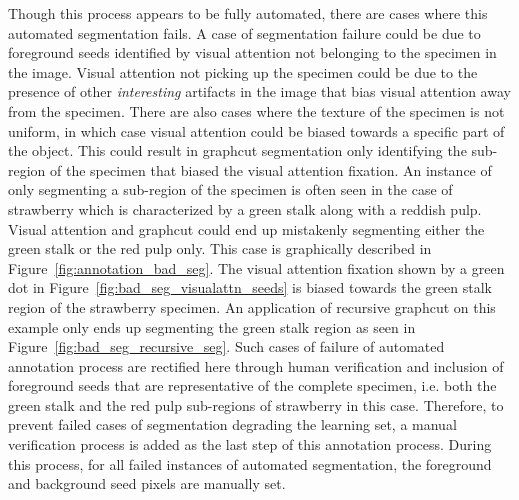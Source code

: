 \documentclass {udthesis}
\begin{document}
Though this process appears to be fully automated, there are cases where this automated segmentation fails. A case of segmentation failure could be due to foreground seeds identified by visual attention not belonging to the specimen in the image. Visual attention not picking up the specimen could be due to the presence of other \emph{interesting} artifacts in the image that bias visual attention away from the specimen. There are also cases where the texture of the specimen is not uniform, in which case visual attention could be biased towards a specific part of the object. This could result in graphcut segmentation only identifying the sub-region of the specimen that biased the visual attention fixation. An instance of only segmenting a sub-region of the specimen is often seen in the case of strawberry which is characterized by a green stalk along with a reddish pulp. Visual attention and graphcut could end up mistakenly segmenting either the green stalk or the red pulp only. This case is graphically 
described in Figure~\ref{fig:annotation_bad_seg}. The visual attention fixation shown by a green dot in Figure~\ref{fig:bad_seg_visualattn_seeds} is biased towards the green stalk region of the strawberry specimen. An application of recursive graphcut on this example only ends up segmenting the green stalk region as seen in Figure~\ref{fig:bad_seg_recursive_seg}. Such cases of failure of automated annotation process are rectified here through human verification and inclusion of foreground seeds that are representative of the complete specimen, i.e. both the green stalk and the red pulp sub-regions of strawberry in this case. Therefore, to prevent failed cases of segmentation degrading the learning set, a manual verification process is added as the last step of this annotation process. During this process, for all failed instances of automated segmentation, the foreground and background seed pixels are manually set. 
%
\end{document}
